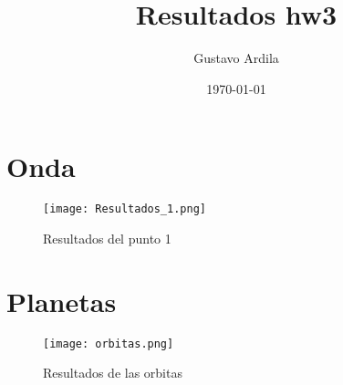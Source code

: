 \documentclass{article}
\title{Resultados hw3}
\author{Gustavo Ardila}
\date{\today}
\begin{document}
\maketitle

\section{Onda}
\begin{figure}
\texttt{[image: Resultados\_1.png]}
\caption{Resultados del punto 1}
\end{figure}
\section{Planetas}
\begin{figure}
\texttt{[image: orbitas.png]}
\caption{Resultados de las orbitas}
\end{figure}
\end{document}

